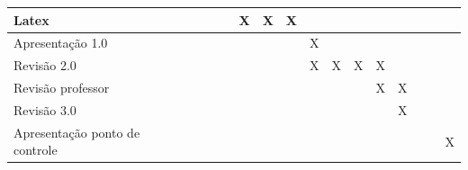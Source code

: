 \begin{table}[H]
\begin{tabular}{|p{2.5cm}|p{0.5cm}|p{0.5cm}|p{0.5cm}|p{0.5cm}|p{0.5cm}|p{0.5cm}|p{0.5cm}|p{0.5cm}|p{0.5cm}|p{0.5cm}|p{0.5cm}|p{0.5cm}|p{0.5cm}|p{0.5cm}|p{0.5cm}|}
Latex                          &                           &                           &                           &                           & \cellcolor{blue}X & \cellcolor{blue}X & \cellcolor{blue}X &                           &                           &                           &                           &                           &       &       &                           \\ \hline
Apresentação 1.0               &                           &                           &                           &                           &                           &                           &                           & \cellcolor{blue}X &                           &                           &                           &                           &       &       &                           \\ \hline
Revisão 2.0                    &                           &                           &                           &                           &                           &                           &                           & \cellcolor{blue}X & \cellcolor{blue}X & \cellcolor{blue}X & \cellcolor{blue}X &                           &       &       &                           \\ \hline
Revisão professor              &                           &                           &                           &                           &                           &                           &                           &                           &                           &                           & \cellcolor{blue}X & \cellcolor{blue}X &       &       &                           \\ \hline
Revisão 3.0                    &                           &                           &                           &                           &                           &                           &                           &                           &                           &                           &                           & \cellcolor{blue}X &       &       &                           \\ \hline
Apresentação ponto de controle &                           &                           &                           &                           &                           &                           &                           &                           &                           &                           &                           &                           &       &       & \cellcolor{blue}X \\ \hline
\end{tabular}
\label{tab:cronograma1}
\end{table}

